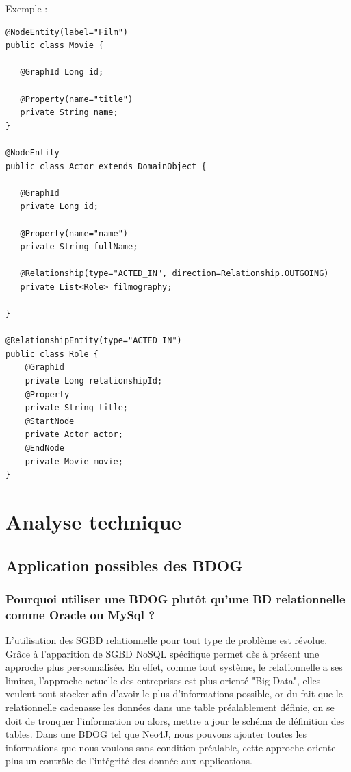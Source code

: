 \documentclass[a4paper,fleqn,12pt]{report}
\begin{document}
Exemple : 

\begin{lstlisting}
@NodeEntity(label="Film")
public class Movie {

   @GraphId Long id;

   @Property(name="title")
   private String name;
}

@NodeEntity
public class Actor extends DomainObject {

   @GraphId
   private Long id;

   @Property(name="name")
   private String fullName;

   @Relationship(type="ACTED_IN", direction=Relationship.OUTGOING)
   private List<Role> filmography;

}

@RelationshipEntity(type="ACTED_IN")
public class Role {
    @GraphId   
    private Long relationshipId;
    @Property  
    private String title;
    @StartNode 
    private Actor actor;
    @EndNode   
    private Movie movie;
}
\end{lstlisting}



\part{Analyse technique}
\chapter{Application possibles des BDOG}
\section{Pourquoi utiliser une BDOG plutôt qu'une BD relationnelle comme Oracle ou MySql ?}

L'utilisation des SGBD relationnelle pour tout type de problème est révolue. Grâce à l'apparition de SGBD NoSQL spécifique permet dès à présent une approche plus personnalisée. En effet, comme tout système, le relationnelle a ses limites, l'approche actuelle des entreprises est plus orienté "Big Data", elles veulent tout stocker afin d'avoir le plus d'informations possible, or du fait que le relationnelle cadenasse les données dans une table préalablement définie, on se doit de tronquer l'information ou alors, mettre a jour le schéma de définition des tables. Dans une BDOG tel que Neo4J, nous pouvons ajouter toutes les informations que nous voulons sans condition préalable, cette approche oriente plus un contrôle de l'intégrité des donnée aux applications.
\end{document}
